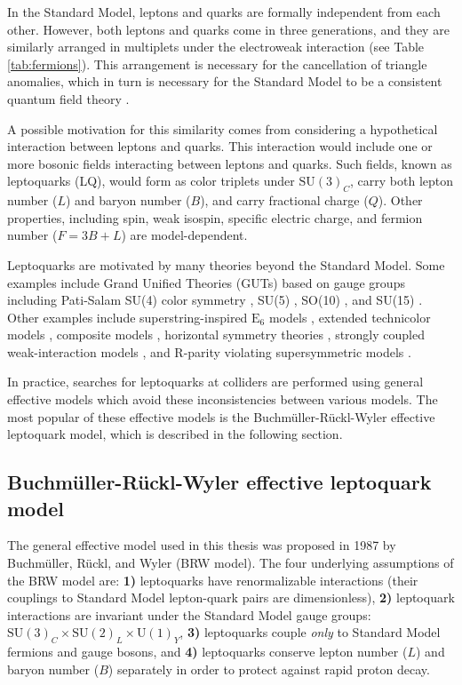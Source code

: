 In the Standard Model, leptons and quarks are formally independent 
from each other.  However, both leptons and quarks come in three generations, 
and they are similarly arranged in multiplets under the electroweak interaction
(see Table \ref{tab:fermions}).  This arrangement is necessary for the
cancellation of triangle anomalies, which in turn is necessary for the 
Standard Model to be a consistent quantum field theory \cite{lq-classification}.

A possible motivation for this similarity comes from considering a hypothetical
interaction between leptons and quarks.  This interaction would include one or more 
bosonic fields interacting between leptons and quarks.  Such fields, known as leptoquarks 
(LQ),
would form as color triplets under $\text{SU}(3)_{C}$,
carry both lepton number ($L$) and baryon number ($B$),
and carry fractional charge ($Q$).  Other properties, including 
spin, weak isospin, specific electric charge, and fermion number 
($F = 3B+L$) are model-dependent.

Leptoquarks are motivated by many theories beyond the Standard Model.
Some examples include 
Grand Unified Theories (GUTs) based
on gauge groups including 
Pati-Salam SU(4) color symmetry \cite{pati-salam-su4-1,pati-salam-su4-2},
SU(5)  \cite{su5-1,su5-2},
SO(10) \cite{su10-1,su10-2},
and SU(15) \cite{su15-1,su15-2}.
Other examples include superstring-inspired $\text{E}_6$ models \cite{superstring_e6},
extended technicolor models \cite{technicolor1,technicolor2,technicolor3},
composite models \cite{composite-1,composite-2},
horizontal symmetry theories \cite{horizontal},
strongly coupled weak-interaction models \cite{strongweak},
and R-parity violating supersymmetric models \cite{rpv1,rpv2,rpv3}.

In practice, searches for leptoquarks at colliders are performed
using general effective models which avoid these inconsistencies between various models.
The most popular of these effective models is the 
Buchm{\"u}ller-R{\"u}ckl-Wyler effective leptoquark model, which is described
in the following section.

\subsection{Buchm{\"u}ller-R{\"u}ckl-Wyler effective leptoquark model}
\label{sec:brw-model}

The general effective model used in this thesis was proposed in 1987 by
Buchm{\"u}ller, R{\"u}ckl, and Wyler \cite{mBRW1} (BRW model).
The four underlying assumptions of the BRW model are:
{\bf 1)} leptoquarks have renormalizable interactions (their couplings to Standard Model lepton-quark pairs are dimensionless),
{\bf 2)} leptoquark interactions are invariant under the Standard Model gauge groups: $\text{SU}(3)_{C} \times \text{SU}(2)_{L} \times \text{U}(1)_{Y}$,
{\bf 3)} leptoquarks couple {\it only} to Standard Model fermions and gauge bosons, and 
{\bf 4)} leptoquarks conserve lepton number ($L$) and baryon number ($B$) separately in order to protect against rapid proton decay.  


